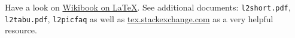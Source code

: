 \documentclass[a4paper,fontsize=12pt,toc=bib]{scrartcl}
\begin{document}
Have a look on \href{https://en.wikibooks.org/wiki/LaTeX/}{Wikibook on \LaTeX}. See additional documents: \texttt{l2short.pdf}, \texttt{l2tabu.pdf}, \texttt{l2picfaq} as well as \url{tex.stackexchange.com} as a very helpful resource.


\label{LastPageBeforeRefs}
\clearpage
\ofoot{\vspace{-0.1cm}\textbf{\large\thepage}/\textbf{\large\pageref{LastBibPage}}}
\printbibliography
\label{LastBibPage}
\end{document}
